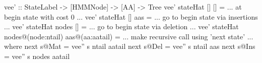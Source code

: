 vee' :: StateLabel -> [HMMNode] -> [AA] -> Tree
vee' stateHat []    []  = ... at begin state with cost 0 ...
vee' stateHat []    aas = ... go to begin state via insertions ...
vee' stateHat nodes []  = ... go to begin state via deletion ...
vee' stateHat nodes@(node:ntail) aas@(aa:aatail) =
          ... make recursive call using 'next state' ...
  where next s@Mat = vee'' s ntail aatail
        next s@Del = vee'' s ntail aas
        next s@Ins = vee'' s nodes aatail
